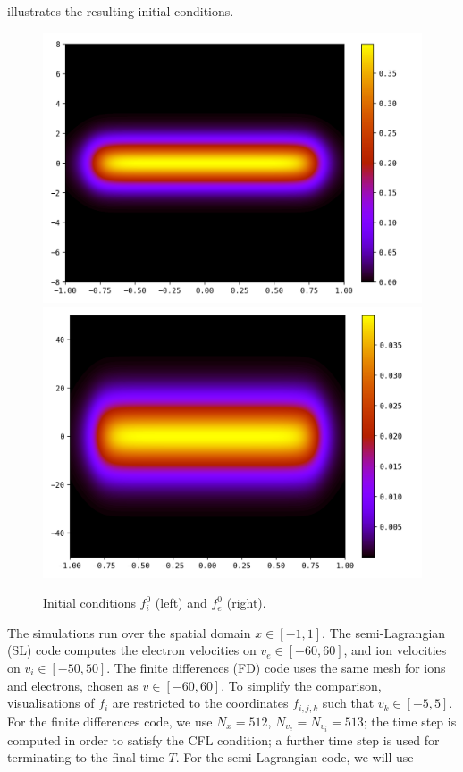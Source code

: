 \documentclass{article}
\numberwithin{equation}{section}
\newcommand{\imh}{\textheight} %
\begin{document}
 illustrates the resulting initial conditions.
\begin{figure}
	\centering
	\renewcommand{\imh}{0.33\linewidth}
	\includegraphics[height=\imh]{images/fi_init}
	\includegraphics[height=\imh]{images/fe_init}
	\caption{Initial conditions $f_i^0$ (left) and $f_e^0$ (right).}
	\label{fig:init_cond}
\end{figure}


The simulations run over the spatial domain $x \in [-1,1]$. The semi-Lagrangian (SL) code computes the electron velocities on $v_e \in [-60, 60]$, and ion velocities on $v_i \in [-50, 50]$. The finite differences (FD) code uses the same mesh for ions and electrons, chosen as $v\in[-60,60]$. To simplify the comparison, visualisations of $f_i$ are restricted to the coordinates $f_{i,j,k}$ such that $v_k \in [-5,5]$.
For the finite differences code, we use $N_x=512$, $N_{v_e}=N_{v_i}=513$; the time step is computed in order to satisfy the CFL condition; a further time step is used for terminating to the final time $T$.  
For the semi-Lagrangian code, we will use
\end{document}
